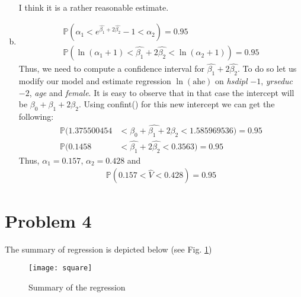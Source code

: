 \documentclass[a4paper]{article}
\newcommand{\prob}{\mathbb{P}}
\begin{document}
\begin{enumerate}[(a)]
\begin{align*}
\end{align*}
I think it is a rather reasonable estimate.
\item 
\begin{align*}
\prob (\alpha_1 < e^{\hat{\beta_1} + 2 \hat{\beta_2}} - 1 < \alpha_{2}) = 0.95\\
\prob (\ln(\alpha_1 + 1) < \hat{\beta_1} + 2\hat{\beta_2} < \ln(\alpha_2 +1)) = 0.95
\end{align*}
Thus, we need to compute a confidence interval for $\hat{\beta_1} + 2 \hat{\beta_2}$. To do so let us modify our model and estimate regression $\ln( \text{ahe})$ on \textit{hsdipl } $- 1$, \textit{yrseduc } $-2$, \textit{age} and \textit{female}. It is easy to observe that in that case the intercept will be $\beta_0 + \beta_1 + 2\beta_2$. Using confint() for this new intercept we can get the following:
\begin{align*}
\prob (1.375500454 &< \widehat{\beta_0 + \beta_1 + 2\beta_2} < 1.585969536) = 0.95\\
\prob(0.1458 &< \hat{\beta_1} + 2\hat{\beta_2} < 0.3563) = 0.95
\end{align*}
Thus, $\alpha_1 = 0.157$, $\alpha_2 = 0.428$ and
\begin{align*}
\prob(0.157 < \hat{V} < 0.428) = 0.95
\end{align*}
\end{enumerate}
\section*{Problem 4}
The summary of regression is depicted below (see Fig. \ref{fig2})


\begin{figure}[h]
	\centering
	\texttt{[image: square]}
	\caption{Summary of the regression}\label{fig2}
\end{figure}
\end{document}
